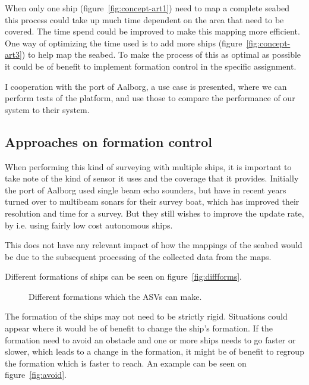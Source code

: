 When only one ship (figure~\vref{fig:concept-art1}) need to map a complete seabed this process could
take up much time dependent on the area that need to be covered. The
time spend could be improved to make this mapping more efficient. One
way of optimizing the time used is to add more ships (figure~\vref{fig:concept-art3}) to help map the
seabed. To make the process of this as optimal as possible it could be
of benefit to implement formation control in the specific assignment.

I cooperation with the port of Aalborg, a use case is presented, where we can perform tests of the platform, and use those to compare the performance of our system to their system.


\subsection{Approaches on formation control}
When performing this kind of surveying with multiple ships, it is important to take note of the kind of sensor it uses and the coverage that it provides. Initially the port of Aalborg used single beam echo sounders, but have in recent years turned over to multibeam sonars for their survey boat, which has improved their resolution and time for a survey. But they still wishes to improve the update rate, by i.e. using fairly low cost autonomous ships.


This does not have any relevant impact of how the mappings of the seabed would be due to the subsequent processing of the collected data from the maps.

Different formations of ships can be seen on figure~\vref{fig:diffforms}.
\begin{figure}[htbp]
	\centering
	
	\caption{Different formations which the \ac{ASV}s can make.}
	\label{fig:diffforms}
\end{figure}

The formation of the ships may not need to be strictly rigid. Situations could appear where it would be of benefit to change the ship's formation. If the formation need to avoid an obstacle and one or more ships needs to go faster or slower, which leads to a change in the formation, it might be of benefit to regroup the formation which is faster to reach. An example can be seen on figure~\vref{fig:avoid}.

